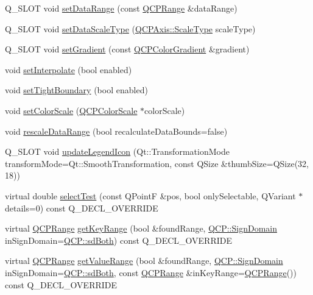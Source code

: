 \begin{DoxyCompactItemize}
\item 
Q\+\_\+\+S\+L\+OT void \hyperlink{class_q_c_p_color_map_a980b42837821159786a85b4b7dcb8774}{set\+Data\+Range} (const \hyperlink{class_q_c_p_range}{Q\+C\+P\+Range} \&data\+Range)
\item 
Q\+\_\+\+S\+L\+OT void \hyperlink{class_q_c_p_color_map_a9d20aa08e3c1f20f22908c45b9c06511}{set\+Data\+Scale\+Type} (\hyperlink{class_q_c_p_axis_a36d8e8658dbaa179bf2aeb973db2d6f0}{Q\+C\+P\+Axis\+::\+Scale\+Type} scale\+Type)
\item 
Q\+\_\+\+S\+L\+OT void \hyperlink{class_q_c_p_color_map_a7313c78360471cead3576341a2c50377}{set\+Gradient} (const \hyperlink{class_q_c_p_color_gradient}{Q\+C\+P\+Color\+Gradient} \&gradient)
\item 
void \hyperlink{class_q_c_p_color_map_a484eaa8a5065cfc386b15375bf98b964}{set\+Interpolate} (bool enabled)
\item 
void \hyperlink{class_q_c_p_color_map_ad03221cc285e5f562a0b13d684b5576d}{set\+Tight\+Boundary} (bool enabled)
\item 
void \hyperlink{class_q_c_p_color_map_aa828921db364fe3c6af4619580ab85fd}{set\+Color\+Scale} (\hyperlink{class_q_c_p_color_scale}{Q\+C\+P\+Color\+Scale} $\ast$color\+Scale)
\item 
void \hyperlink{class_q_c_p_color_map_a856608fa3dd1cc290bcd5f29a5575774}{rescale\+Data\+Range} (bool recalculate\+Data\+Bounds=false)
\item 
Q\+\_\+\+S\+L\+OT void \hyperlink{class_q_c_p_color_map_a5d8158b62d55fcfeaabcb68ce0083e87}{update\+Legend\+Icon} (Qt\+::\+Transformation\+Mode transform\+Mode=Qt\+::\+Smooth\+Transformation, const Q\+Size \&thumb\+Size=Q\+Size(32, 18))
\item 
virtual double \hyperlink{class_q_c_p_color_map_afb4b843596addf58096082827a9e3450}{select\+Test} (const Q\+PointF \&pos, bool only\+Selectable, Q\+Variant $\ast$details=0) const Q\+\_\+\+D\+E\+C\+L\+\_\+\+O\+V\+E\+R\+R\+I\+DE
\item 
virtual \hyperlink{class_q_c_p_range}{Q\+C\+P\+Range} \hyperlink{class_q_c_p_color_map_a985861974560f950af6cb7fae8c46267}{get\+Key\+Range} (bool \&found\+Range, \hyperlink{namespace_q_c_p_afd50e7cf431af385614987d8553ff8a9}{Q\+C\+P\+::\+Sign\+Domain} in\+Sign\+Domain=\hyperlink{namespace_q_c_p_afd50e7cf431af385614987d8553ff8a9aa38352ef02d51ddfa4399d9551566e24}{Q\+C\+P\+::sd\+Both}) const Q\+\_\+\+D\+E\+C\+L\+\_\+\+O\+V\+E\+R\+R\+I\+DE
\item 
virtual \hyperlink{class_q_c_p_range}{Q\+C\+P\+Range} \hyperlink{class_q_c_p_color_map_a88134493aaf6b297af34eaab65264fff}{get\+Value\+Range} (bool \&found\+Range, \hyperlink{namespace_q_c_p_afd50e7cf431af385614987d8553ff8a9}{Q\+C\+P\+::\+Sign\+Domain} in\+Sign\+Domain=\hyperlink{namespace_q_c_p_afd50e7cf431af385614987d8553ff8a9aa38352ef02d51ddfa4399d9551566e24}{Q\+C\+P\+::sd\+Both}, const \hyperlink{class_q_c_p_range}{Q\+C\+P\+Range} \&in\+Key\+Range=\hyperlink{class_q_c_p_range}{Q\+C\+P\+Range}()) const Q\+\_\+\+D\+E\+C\+L\+\_\+\+O\+V\+E\+R\+R\+I\+DE
\end{DoxyCompactItemize}
